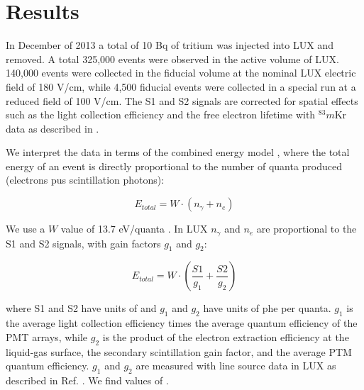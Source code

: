 \section{Results}

In December of 2013 a total of 10 Bq of tritium was injected into LUX and removed. A total 325,000 events were observed in the active volume of LUX. 140,000 events were collected in the fiducial volume at the nominal LUX electric field of 180 V/cm, while 4,500 fiducial events were collected in a special run at a reduced field of 100 V/cm. The S1 and S2 signals are corrected for spatial effects such as the light collection efficiency and the free electron lifetime with $^83m$Kr data as described in \cite{lux-reanalysis}. 

We interpret the data in terms of the combined energy model \cite{platzman}, where the total energy of an event is directly proportional to the number of quanta produced (electrons pus scintillation photons):

\begin{displaymath}
E_{total} = W \cdot (n_{\gamma} + n_e )
\end{displaymath}

\noindent
We use a $W$ value of 13.7 eV/quanta \cite{Dahl_Thesis}. In LUX $n_{\gamma}$ and $n_e$ are proportional to the S1 and S2 signals, with gain factors $g_1$ and $g_2$:

\begin{displaymath}
E_{total} = W \cdot (\frac{S1}{g_1} + \frac{S2}{g_2} )
\end{displaymath}

\noindent
where S1 and S2 have units of  and $g_1$ and $g_2$ have units of phe per quanta. $g_1$ is the average light collection efficiency times the average quantum efficiency of the PMT arrays, while $g_2$ is the product of the electron extraction efficiency at the liquid-gas surface, the secondary scintillation gain factor, and the average PTM quantum efficiency. $g_1$ and $g_2$ are measured with line source data in LUX as described in Ref. \cite{lux-reanalysis, lux-prd}. We find values of .

